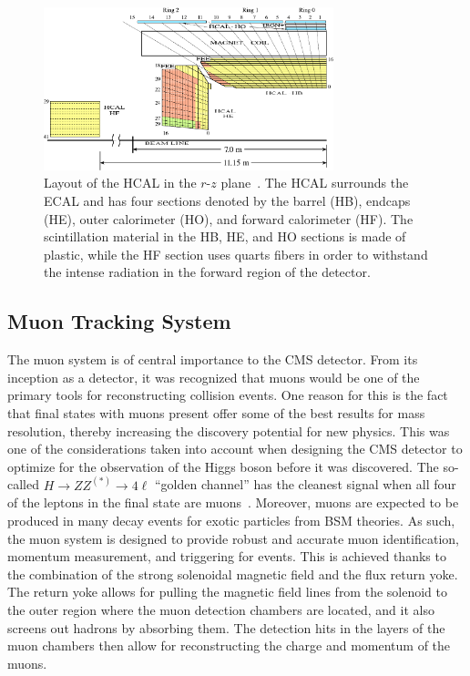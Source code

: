 \begin{figure}[htbp]
  \centering
  \includegraphics[width=0.75\textwidth]{fig/experiment/HCAL-HB-HE-HO-HF.pdf}
  \caption[
    Layout of the HCAL in the $r$-$z$ plane.
    The HCAL surrounds the ECAL and has four sections denoted by the barrel (HB), endcaps (HE), outer calorimeter (HO), and forward calorimeter (HF).
    The scintillation material in the HB, HE, and HO sections is made of plastic, while the HF section uses quarts fibers in order to withstand the intense radiation in the forward region of the detector.
  ]{
    Layout of the HCAL in the $r$-$z$ plane~\cite{Collaboration_2010_HCAL}.
    The HCAL surrounds the ECAL and has four sections denoted by the barrel (HB), endcaps (HE), outer calorimeter (HO), and forward calorimeter (HF).
    The scintillation material in the HB, HE, and HO sections is made of plastic, while the HF section uses quarts fibers in order to withstand the intense radiation in the forward region of the detector.
  }
  \label{fig:CMSHCAL}
\end{figure}

\subsection{Muon Tracking System}
\label{subsec:muonTrack}

The muon system is of central importance to the CMS detector.
From its inception as a detector, it was recognized that muons would be one of the primary tools for reconstructing collision events.
One reason for this is the fact that final states with muons present offer some of the best results for mass resolution, thereby increasing the discovery potential for new physics.
This was one of the considerations taken into account when designing the CMS detector to optimize for the observation of the Higgs boson before it was discovered.
The so-called $H\to ZZ^{(*)}\to 4\ell$ ``golden channel'' has the cleanest signal when all four of the leptons in the final state are muons~\cite{Gainer_2011}.
Moreover, muons are expected to be produced in many decay events for exotic particles from BSM theories.
As such, the muon system is designed to provide robust and accurate muon identification, momentum measurement, and triggering for events.
This is achieved thanks to the combination of the strong solenoidal magnetic field and the flux return yoke.
The return yoke allows for pulling the magnetic field lines from the solenoid to the outer region where the muon detection chambers are located, and it also screens out hadrons by absorbing them.
The detection hits in the layers of the muon chambers then allow for reconstructing the charge and momentum of the muons.

